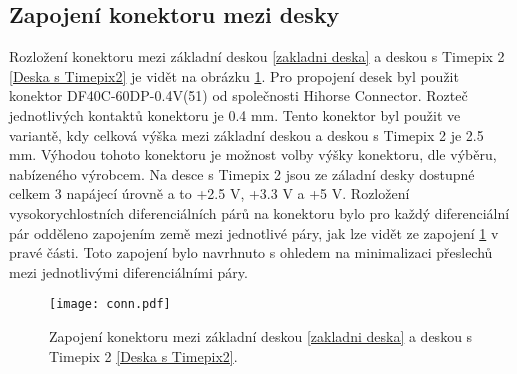 	\subsection{Zapojení konektoru mezi desky}	%
	\label{konektor}
	Rozložení konektoru mezi základní deskou \ref{zakladni deska} a deskou s Timepix 2 \ref{Deska s Timepix2} je vidět na obrázku \ref{fig:konektor}. Pro propojení desek byl použit konektor DF40C-60DP-0.4V(51) od společnosti Hihorse Connector. Rozteč jednotlivých kontaktů konektoru je 0.4 mm. Tento konektor byl použit ve variantě, kdy celková výška mezi základní deskou a deskou s Timepix 2 je 2.5 mm. Výhodou tohoto konektoru je možnost volby výšky konektoru, dle výběru, nabízeného výrobcem. Na desce s Timepix 2 jsou ze záladní desky dostupné celkem 3 napájecí úrovně a to +2.5 V, +3.3 V a +5 V. Rozložení vysokorychlostních diferenciálních párů na konektoru bylo pro každý diferenciální pár odděleno zapojením země mezi jednotlivé páry, jak lze vidět ze zapojení \ref{fig:konektor} v pravé části. Toto zapojení bylo navrhnuto s ohledem na minimalizaci přeslechů mezi jednotlivými diferenciálními páry.
	\begin{figure}[h!]
		\centering
		\captionsetup{justification=centering}
		\texttt{[image: conn.pdf]}
		\caption{Zapojení konektoru mezi základní deskou \ref{zakladni deska} a deskou s Timepix 2 \ref{Deska s Timepix2}.} 
		\label{fig:konektor}
	\end{figure} 
	
